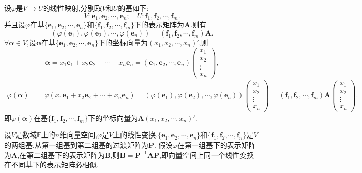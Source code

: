\documentclass[../../main.tex]{subfiles}
\begin{document}
\begin{corollary}
设\(\varphi\)是\(V\rightarrow U\)的线性映射,分别取\(V\)和\(U\)的基如下:
\[
V: \boldsymbol{e}_1, \boldsymbol{e}_2, \cdots, \boldsymbol{e}_n; \quad U: \boldsymbol{f}_1, \boldsymbol{f}_2, \cdots, \boldsymbol{f}_m.
\]
并且设\(\varphi\)在基\(\{\boldsymbol{e}_1, \boldsymbol{e}_2, \cdots, \boldsymbol{e}_n\}\)和\(\{\boldsymbol{f}_1, \boldsymbol{f}_2, \cdots, \boldsymbol{f}_m\}\)下的表示矩阵为\(\boldsymbol{A}\).则有
\[
(\varphi(\boldsymbol{e}_1), \varphi(\boldsymbol{e}_2), \cdots, \varphi(\boldsymbol{e}_n)) = (\boldsymbol{f}_1, \boldsymbol{f}_2, \cdots, \boldsymbol{f}_m)\boldsymbol{A}.
\]
\(\forall \boldsymbol{\alpha} \in V\),设\(\boldsymbol{\alpha}\)在基\(\{\boldsymbol{e}_1, \boldsymbol{e}_2, \cdots, \boldsymbol{e}_n\}\)下的坐标向量为\((x_1, x_2, \cdots, x_n)'\),则
\[
\boldsymbol{\alpha} = x_1\boldsymbol{e}_1 + x_2\boldsymbol{e}_2 + \cdots + x_n\boldsymbol{e}_n = (\boldsymbol{e}_1, \boldsymbol{e}_2, \cdots, \boldsymbol{e}_n)\begin{pmatrix}
x_1 \\
x_2 \\
\vdots \\
x_n
\end{pmatrix},
\]
\begin{align*}
\varphi(\boldsymbol{\alpha}) &= \varphi(x_1\boldsymbol{e}_1 + x_2\boldsymbol{e}_2 + \cdots + x_n\boldsymbol{e}_n)
= (\varphi(\boldsymbol{e}_1), \varphi(\boldsymbol{e}_2), \cdots, \varphi(\boldsymbol{e}_n))\begin{pmatrix}
x_1 \\
x_2 \\
\vdots \\
x_n
\end{pmatrix} 
= (\boldsymbol{f}_1, \boldsymbol{f}_2, \cdots, \boldsymbol{f}_m)\boldsymbol{A}\begin{pmatrix}
x_1 \\
x_2 \\
\vdots \\
x_n
\end{pmatrix}.
\end{align*}
即\(\varphi(\boldsymbol{\alpha})\)在基\(\{\boldsymbol{f}_1, \boldsymbol{f}_2, \cdots, \boldsymbol{f}_m\}\)下的坐标向量为\(\boldsymbol{A}(x_1, x_2, \cdots, x_n)'\).
\end{corollary}

\begin{theorem}\label{theorem:向量空间上同一个线性变换在不同基下的表示矩阵必相似}
设\(V\)是数域\(\mathbb{F}\)上的\(n\)维向量空间,\(\varphi\)是\(V\)上的线性变换,\(\{\boldsymbol{e}_1,\boldsymbol{e}_2,\cdots,\boldsymbol{e}_n\}\)和\(\{\boldsymbol{f}_1,\boldsymbol{f}_2,\cdots,\boldsymbol{f}_n\}\)是\(V\)的两组基,从第一组基到第二组基的过渡矩阵为\(\boldsymbol{P}\). 假设\(\varphi\)在第一组基下的表示矩阵为\(\boldsymbol{A}\),在第二组基下的表示矩阵为\(\boldsymbol{B}\),则\(\boldsymbol{B}=\boldsymbol{P}^{-1}\boldsymbol{A}\boldsymbol{P}\),即向量空间上同一个线性变换在不同基下的表示矩阵必相似.
\end{theorem}
\end{document}

